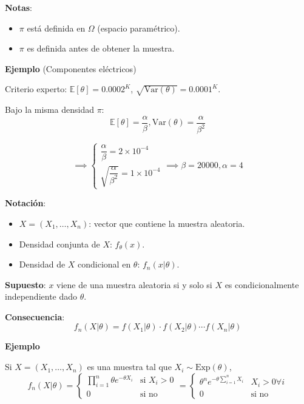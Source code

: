 \documentclass[
  12pt,
]{book}
\begin{document}
\textbf{Notas}:

\begin{itemize}
\item
  \(\pi\) está definida en \(\Omega\) (espacio paramétrico).
\item
  \(\pi\) es definida antes de obtener la muestra.
\end{itemize}

\textbf{Ejemplo} (Componentes eléctricos)

Criterio experto: \(\mathbb{E}[\theta] = 0.0002^K\), \(\sqrt{\text{Var}(\theta)} = 0.0001^K\).

Bajo la misma densidad \(\pi\):
\[ \mathbb{E}[\theta] = \dfrac{\alpha}{\beta}, \text{Var}(\theta) = \dfrac{\alpha}{\beta^2}\]

\[\implies \begin{cases}\dfrac{\alpha}{\beta} = 2\times 10^{-4}\\\sqrt{\dfrac{\alpha}{\beta^2}} = 1 \times 10^{-4}\end{cases} \implies \beta = 20000, \alpha = 4\]

\textbf{Notación}:

\begin{itemize}
\item
  \(X = (X_1,\dots, X_n)\): vector que contiene la muestra aleatoria.
\item
  Densidad conjunta de \(X\): \(f_\theta(x)\).
\item
  Densidad de \(X\) condicional en \(\theta\): \(f_n(x|\theta)\).
\end{itemize}

\textbf{Supuesto}: \(x\) viene de una muestra aleatoria si y solo si \(X\) es condicionalmente independiente dado \(\theta\).

\textbf{Consecuencia}: \[f_n(X|\theta) = f(X_1|\theta)\cdot f(X_2|\theta)\cdots f(X_n|\theta)\]

\textbf{Ejemplo}

Si \(X = (X_1,\dots, X_n)\) es una muestra tal que \(X_i\sim \text{Exp}(\theta)\),
\[ f_n(X|\theta) = \begin{cases}\prod_{i=1}^n \theta e^{-\theta X_i} & \text{si } X_i>0\\
0 & \text{si no}
\end{cases} = \begin{cases}\theta^n e^{-\theta\sum_{i=1}^n X_i} & X_i > 0 \forall i\\ 0 & \text{si no}\end{cases}\]
\end{document}

